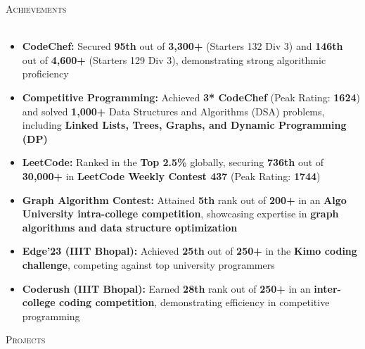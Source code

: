 \documentclass[a4paper]{article}
\newcommand{\lineunder} {
    \vspace*{-8pt} \\
    \hspace*{-18pt} \hrulefill \\
}
\newcommand{\header} [1] {
    {\hspace*{-18pt}\vspace*{6pt} \textsc{#1}}
    \vspace*{-6pt} \lineunder
}
\begin{document}
\header{Achievements}
\vspace{-2mm}
\begin{itemize}
    \item \textbf{CodeChef:} Secured \textbf{95th} out of \textbf{3,300+} (Starters 132 Div 3) and \textbf{146th} out of \textbf{4,600+} (Starters 129 Div 3), demonstrating strong algorithmic proficiency
    
    \item \textbf{Competitive Programming:} Achieved \textbf{3* CodeChef} (Peak Rating: \textbf{1624}) and solved \textbf{1,000+} Data Structures and Algorithms (DSA) problems, including \textbf{Linked Lists, Trees, Graphs, and Dynamic Programming (DP)}
    
    \item \textbf{LeetCode:} Ranked in the \textbf{Top 2.5\%} globally, securing \textbf{736th} out of \textbf{30,000+} in \textbf{LeetCode Weekly Contest 437} (Peak Rating: \textbf{1744})
    
    \item \textbf{Graph Algorithm Contest:} Attained \textbf{5th} rank out of \textbf{200+} in an \textbf{Algo University intra-college competition}, showcasing expertise in \textbf{graph algorithms and data structure optimization}
    
    \item \textbf{Edge'23 (IIIT Bhopal):} Achieved \textbf{25th} out of \textbf{250+} in the \textbf{Kimo coding challenge}, competing against top university programmers
    
    \item \textbf{Coderush (IIIT Bhopal):} Earned \textbf{28th} rank out of \textbf{250+} in an \textbf{inter-college coding competition}, demonstrating efficiency in competitive programming
\end{itemize}   

\vspace{-2mm}

\header{Projects}
\end{document}
